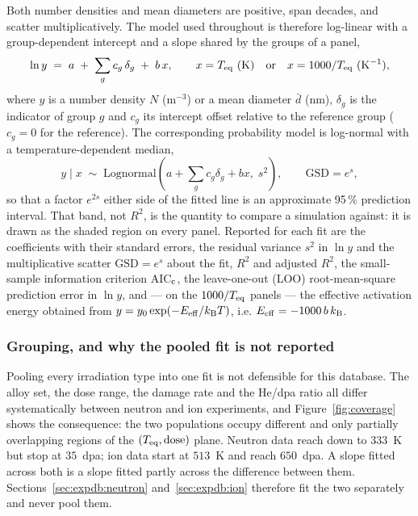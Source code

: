 Both number densities and mean diameters are positive, span decades, and scatter
multiplicatively. The model used throughout is therefore log-linear with a
group-dependent intercept and a slope shared by the groups of a panel,
\begin{equation}
  \ln y \;=\; a \;+\; \sum_{g} c_g\,\delta_g \;+\; b\,x,
  \qquad x = T_{\rm eq}~\text{(K)} \quad\text{or}\quad x = 1000/T_{\rm eq}~(\mathrm{K}^{-1}),
  \label{eq:model}
\end{equation}
where $y$ is a number density $N$ (m$^{-3}$) or a mean diameter $\bar d$ (nm),
$\delta_g$ is the indicator of group $g$ and $c_g$ its intercept offset relative
to the reference group ($c_g = 0$ for the reference). The corresponding
probability model is log-normal with a temperature-dependent median,
\begin{equation}
  y \mid x \;\sim\; \mathrm{Lognormal}\!\left(a + \textstyle\sum_g c_g\delta_g + bx,\; s^{2}\right),
  \qquad \mathrm{GSD} = e^{s},
  \label{eq:lognormal}
\end{equation}
so that a factor $e^{2s}$ either side of the fitted line is an approximate 95\,\%
prediction interval. That band, not $R^{2}$, is the quantity to compare a
simulation against: it is drawn as the shaded region on every panel. Reported for
each fit are the coefficients with their standard errors, the residual variance
$s^{2}$ in $\ln y$ and the multiplicative scatter $\mathrm{GSD}=e^{s}$ about the
fit, $R^{2}$ and adjusted $R^{2}$, the small-sample information criterion
AIC$_{\rm c}$, the leave-one-out (LOO) root-mean-square prediction error in
$\ln y$, and --- on the $1000/T_{\rm eq}$ panels --- the effective activation
energy obtained from $y = y_0\exp(-E_{\rm eff}/k_{\rm B}T)$, i.e.
$E_{\rm eff} = -1000\,b\,k_{\rm B}$.

\subsubsection*{Grouping, and why the pooled fit is not reported}

Pooling every irradiation type into one fit is not defensible for this database.
The alloy set, the dose range, the damage rate and the He/dpa ratio all differ
systematically between neutron and ion experiments, and Figure~\ref{fig:coverage}
shows the consequence: the two populations occupy different and only partially
overlapping regions of the $(T_{\rm eq}, \text{dose})$ plane. Neutron data reach
down to $333$~K but stop at $35$~dpa; ion data start at $513$~K and reach
$650$~dpa. A slope fitted across both is a slope fitted partly across the
difference between them. Sections~\ref{sec:expdb:neutron}
and~\ref{sec:expdb:ion} therefore fit the two separately and never pool them.


